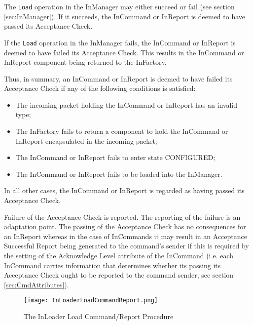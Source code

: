The \texttt{Load} operation in the InManager may either succeed or fail (see section \ref{sec:InManager}). If it succeeds, the InCommand or InReport is deemed to have passed its Acceptance Check. 
  
If the \texttt{Load} operation in the InManager fails, the InCommand or InReport is deemed to have failed its Acceptance Check. This results in the InCommand or InReport component being returned to the InFactory.

Thus, in summary, an InCommand or InReport is deemed to have failed its Acceptance Check if any of the following conditions is satisfied:
\begin{itemize}
\item The incoming packet holding the InCommand or InReport has an invalid type;
\item The InFactory fails to return a component to hold the InCommand or InReport encapsulated in the incoming packet;
\item The InCommand or InReport fails to enter state CONFIGURED;
\item The InCommand or InReport fails to be loaded into the InManager.
\end{itemize}
In all other cases, the InCommand or InReport is regarded as having passed its Acceptance Check. 

Failure of the Acceptance Check is reported. The reporting of the failure is an adaptation point. The passing of the Acceptance Check has no consequences for an InReport whereas in the case of InCommands it may result in an Acceptance Successful Report being generated to the command's sender if this is required by the setting of the Acknowledge Level attribute of the InCommand (i.e. each InCommand carries information that determines whether its passing its Acceptance Check ought to be reported to the command sender, see section \ref{sec:CmdAttributes}). 

\begin{figure}[H]
 \centering
 \texttt{[image: InLoaderLoadCommandReport.png]}
 \caption{The InLoader Load Command/Report Procedure}
 \label{fig:InLoaderLoadCommandReport}
\end{figure}

